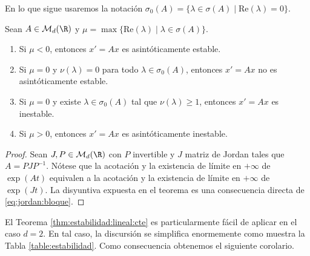En lo que sigue usaremos la notación
$\sigma_0(A) = \{\lambda \in \sigma(A) \mid \mathrm{Re}(\lambda) = 0\}$.

\begin{theorem}\label{thm:estabilidad:lineal:cte}
  Sean $A \in \mathcal{M}_d(\R)$ y $\mu = \max \{\mathrm{Re}(\lambda) \mid \lambda \in \sigma(A)\}$.
  \begin{enumerate}
  \item Si $\mu < 0$, entonces $x' = A x$ es asintóticamente estable.
  \item Si $\mu = 0$ y $\nu(\lambda) = 0$ para todo $\lambda \in \sigma_0(A)$, entonces $x' = A x$
    no es asintóticamente estable.
  \item Si $\mu = 0$ y existe $\lambda \in \sigma_0(A)$ tal que $\nu(\lambda) \ge 1$, entonces
    $x' = A x$ es inestable.
  \item Si $\mu > 0$, entonces $x' = A x$ es asintóticamente inestable.
  \end{enumerate}
\end{theorem}
\begin{proof}
  Sean $J, P \in \mathcal{M}_d(\R)$ con $P$ invertible y $J$ matriz de Jordan tales que
  $A = P J P^{-1}$. Nótese que la acotación y la existencia de límite en $+\infty$ de $\exp(A t)$
  equivalen a la acotación y la existencia de límite en $+\infty$ de $\exp(J t)$. La disyuntiva
  expuesta en el teorema es una consecuencia directa de \eqref{eq:jordan:bloque}.
\end{proof}


El Teorema \ref{thm:estabilidad:lineal:cte} es particularmente fácil de aplicar en el caso $d =
2$. En tal caso, la discursión se simplifica enormemente como muestra la Tabla
\ref{table:estabilidad}. Como consecuencia obtenemos el siguiente corolario.


